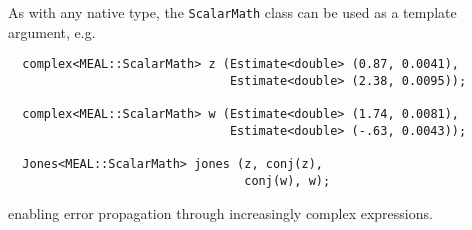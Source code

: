 \documentclass[12pt]{article}
\begin{document}
\noindent
As with any native type, the {\tt ScalarMath} class can be used as a
template argument, e.g.
\begin{verbatim}
  complex<MEAL::ScalarMath> z (Estimate<double> (0.87, 0.0041),
                               Estimate<double> (2.38, 0.0095));

  complex<MEAL::ScalarMath> w (Estimate<double> (1.74, 0.0081),
                               Estimate<double> (-.63, 0.0043));

  Jones<MEAL::ScalarMath> jones (z, conj(z),
                                 conj(w), w);
\end{verbatim}
enabling error propagation through increasingly complex expressions.
\end{document}
